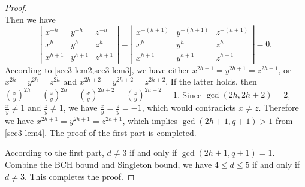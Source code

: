\documentclass[10pt]{article}%
\begin{document}
\begin{proof}
\begin{equation*}
		\end{equation*}
		Then we have
		\begin{equation*}
			\left|\begin{array}{lll}
				x^{-h} & y^{-h} & z^{-h}\\ x^h & y^h & z^h\\ x^{h+1} & y^{h+1} & z^{h+1}
			\end{array}\right|
			=\left|\begin{array}{lll}x^{-(h+1)} & y^{-(h+1)} & z^{-(h+1)}\\ x^h & y^h & z^h\\ x^{h+1} & y^{h+1} & z^{h+1}\end{array}\right|
			=0.
		\end{equation*}
		According to \cref{sec3 lem2,sec3 lem3}, we have either $x^{2h+1} = y^{2h+1} = z^{2h+1}$, or $x^{2h} = y^{2h} = z^{2h}$ and  $x^{2h+2} = y^{2h+2} = z^{2h+2}$. If the latter holds, then $\left(\frac{x}{y}\right)^{2h}=\left(\frac{z}{y}\right)^{2h}=\left(\frac{x}{y}\right)^{2h+2}=\left(\frac{z}{y}\right)^{2h+2}=1$. Since $\gcd(2h,2h+2)=2$, $\frac{x}{y}\ne1$ and $\frac{z}{y}\ne1$, we have $\frac{x}{y}=\frac{z}{y}=-1$, which would contradicts $x\ne z$. Therefore we have $x^{2h+1} = y^{2h+1} = z^{2h+1}$, which implies $\gcd(2h+1,q+1)>1$ from \cref{sec3 lem4}. The proof of the first part is completed. 
		
		According to the first part, $d \ne 3$ if and only if $\gcd(2h+1,q+1)=1$. Combine the BCH bound and Singleton bound, we have $4 \le d \le 5$ if and only if $d\ne3$. This completes the proof.
	\end{proof}
	
\end{document}
